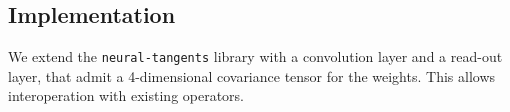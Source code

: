 \documentclass{article}
\theoremstyle{definition}
\newcommand{\vX}{\mathbf{X}}
\begin{document}

\subsection{Implementation}
We extend the \texttt{neural-tangents} \citep{neuraltangents2020} library with a convolution layer and a read-out layer, that admit a 4-dimensional covariance tensor for the weights. This allows interoperation with existing operators.
\end{document}
